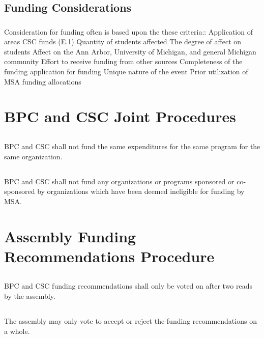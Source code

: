 \subsection{Funding Considerations}
\subsubsection{}
Consideration for funding often is based upon the these criteria::
\subsubsubsection{}
Application of areas CSC funds (E.1)
\subsubsubsection{}
Quantity of students affected 
\subsubsubsection{}
The degree of affect on students
\subsubsubsection{}
Affect on the Ann Arbor, University of Michigan, and general Michigan community
\subsubsubsection{}
Effort to receive funding from other sources
\subsubsubsection{}
Completeness of the funding application for funding
\subsubsubsection{}
Unique nature of the event
\subsubsubsection{}
Prior utilization of MSA funding allocations


\section{BPC and CSC Joint Procedures}

\subsection{}
BPC and CSC shall not fund the same expenditures for the same program for the same organization.

\subsection{}
BPC and CSC shall not fund any organizations or programs sponsored or co-sponsored by organizations which have been deemed ineligible for funding by MSA. 


\section{Assembly Funding Recommendations Procedure}

\subsection{}
BPC and CSC funding recommendations shall only be voted on after two reads by the assembly. 

\subsection{}
The assembly may only vote to accept or reject the funding recommendations on a whole.

